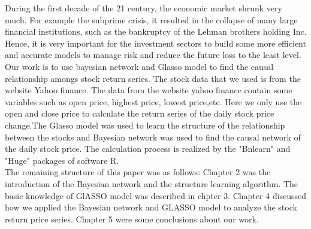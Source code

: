 \documentclass[12pt]{article}
\theoremstyle{plain}
\begin{document}
During the first decade of the 21 century, the economic market shrunk very much. For example the subprime crisis, it resulted in the collapse of many large financial institutions, such as the bankruptcy of the Lehman brothers holding Inc. Hence, it is very important for the investment sectors to build some more efficient and accurate models to manage risk and reduce the future loss to the least level.
Our work is to use bayesian network and Glasso model to find the causal relationship amongs stock return series. The stock data that we used is from the website Yahoo finance. The data from the website yahoo finance contain some variables such as open price, highest price, lowest price,etc. Here we only use the open and close price to calculate the  return series of the daily stock price change.The Glasso model was used to learn the structure of the relationship between the stocks and Bayesian network was used to find the causal network of  the daily stock price. The calculation process is realized by the "Bnlearn" and "Huge" packages of software R.\\

The remaining structure of this paper was as follows: Chapter 2 was the introduction of the Bayesian network and the structure learning algorithm. The basic knowledge of GlASSO model was described in chpter 3. Chapter 4 discussed how we applied the Bayesian network and GLASSO model to analyze the stock return price series. Chapter 5 were some conclusions about our work.
\end{document}
